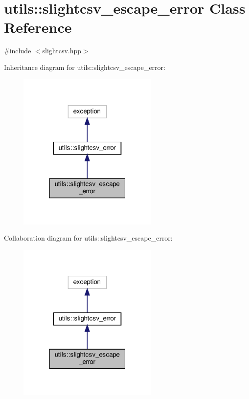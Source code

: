 \hypertarget{classutils_1_1slightcsv__escape__error}{}\section{utils\+:\+:slightcsv\+\_\+escape\+\_\+error Class Reference}
\label{classutils_1_1slightcsv__escape__error}


{\ttfamily \#include $<$slightcsv.\+hpp$>$}



Inheritance diagram for utils\+:\+:slightcsv\+\_\+escape\+\_\+error\+:
\nopagebreak
\begin{figure}[H]
\begin{center}
\leavevmode
\includegraphics[width=196pt]{classutils_1_1slightcsv__escape__error__inherit__graph}
\end{center}
\end{figure}


Collaboration diagram for utils\+:\+:slightcsv\+\_\+escape\+\_\+error\+:
\nopagebreak
\begin{figure}[H]
\begin{center}
\leavevmode
\includegraphics[width=196pt]{classutils_1_1slightcsv__escape__error__coll__graph}
\end{center}
\end{figure}


